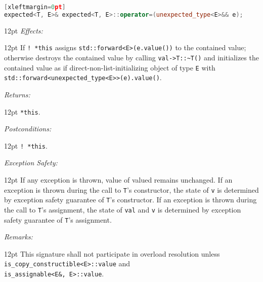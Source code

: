 \documentclass[a4paper,10pt]{article}
\newcommand{\cpp}[1]{\lstinline{#1}}
\newcommand{\wordingItem}[1]{\noindent\textit{#1:}}
\newenvironment{wordingTextItem}[1]{\wordingItem{#1}\vspace{2pt}\noindent\begin{adjustwidth}{12pt}{}}{\vspace{2pt}\end{adjustwidth}}
\newenvironment{wordingPara}{\begin{adjustwidth}{12pt}{}}{\end{adjustwidth}}
\begin{document}
\begin{lstlisting}[language=C++][xleftmargin=0pt]
expected<T, E>& expected<T, E>::operator=(unexpected_type<E>&& e); 
\end{lstlisting}
\begin{wordingPara}
\begin{wordingTextItem}{Effects}
If \cpp{! *this} assigns \cpp{std::forward<E>(e.value())} to the contained value; otherwise destroys the contained value by calling \cpp{val->T::~T()} and initializes the contained value as if direct-non-list-initializing object of type \cpp{E} with \cpp{std::forward<unexpected_type<E>>(e).value()}.
\end{wordingTextItem}
\begin{wordingTextItem}{Returns}
\cpp{*this}.
\end{wordingTextItem}
\begin{wordingTextItem}{Postconditions}
\cpp{! *this}.
\end{wordingTextItem}
\begin{wordingTextItem}{Exception Safety}
If any exception is thrown, value of valued remains unchanged. If an exception is thrown during the call to \cpp{T}'s constructor, the state of \cpp{v} is determined by exception safety guarantee of \cpp{T}'s constructor. If an exception is thrown during the call to \cpp{T}'s assignment, the state of \cpp{val} and \cpp{v} is determined by exception safety guarantee of \cpp{T}'s assignment.
\end{wordingTextItem}
\begin{wordingTextItem}{Remarks}
This signature shall not participate in overload resolution unless\\
\cpp{is_copy_constructible<E>::value} and \\
\cpp{is_assignable<E&, E>::value}.
\end{wordingTextItem}
\end{wordingPara}
\end{document}
